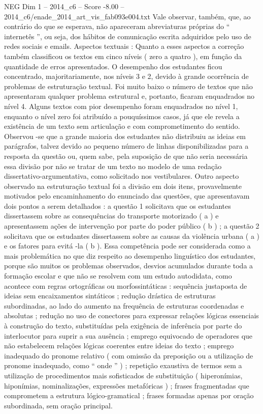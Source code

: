 \begin{textsample}{NEG Dim 1 – 2014\_c6 – Score -8.00 – 2014\_c6/enade\_2014\_art\_vis\_fab093e004.txt}
Vale observar, também, que, ao contrário do que se esperava, não apareceram abreviaturas próprias do “ internetês ”, ou seja, dos hábitos de comunicação escrita adquiridos pelo uso de redes sociais e emails.
Aspectos textuais : Quanto a esses aspectos a correção também classificou os textos em cinco níveis ( zero a quatro ), em função da quantidade de erros apresentados.
O desempenho dos estudantes ficou concentrado, majoritariamente, nos níveis 3 e 2, devido à grande ocorrência de problemas de estruturação textual.
Foi muito baixo o número de textos que não apresentaram qualquer problema estrutural e, portanto, ficaram enquadrados no nível 4.
Alguns textos com pior desempenho foram enquadrados no nível 1, enquanto o nível zero foi atribuído a pouquíssimos casos, já que ele revela a existência de um texto sem articulação e com comprometimento do sentido.
Observou -se que a grande maioria dos estudantes não distribuiu as ideias em parágrafos, talvez devido ao pequeno número de linhas disponibilizadas para a resposta da questão ou, quem sabe, pela suposição de que não seria necessária essa divisão por não se tratar de um texto no modelo de uma redação dissertativo-argumentativa, como solicitado nos vestibulares.
Outro aspecto observado na estruturação textual foi a divisão em dois itens, provavelmente motivados pelo encaminhamento do enunciado das questões, que apresentavam dois pontos a serem detalhados : a questão 1 solicitava que os estudantes dissertassem sobre as consequências do transporte motorizado ( a ) e apresentassem ações de intervenção por parte do poder público ( b ) ; a questão 2 solicitava que os estudantes dissertassem sobre as causas da violência urbana ( a ) e os fatores para evitá -la ( b ).
Essa competência pode ser considerada como a mais problemática no que diz respeito ao desempenho linguístico dos estudantes, porque são muitos os problemas observados, desvios acumulados durante toda a formação escolar e que não se resolvem com um estudo autodidata, como acontece com regras ortográficas ou morfossintáticas : sequência justaposta de ideias sem encaixamentos sintáticos ; redução drástica de estruturas subordinadas, ao lado do aumento na frequência de estruturas coordenadas e absolutas ; redução no uso de conectores para expressar relações lógicas essenciais à construção do texto, substituídas pela exigência de inferência por parte do interlocutor para suprir a sua ausência ; emprego equivocado de operadores que não estabelecem relações lógicas coerentes entre ideias do texto ; emprego inadequado do pronome relativo ( com omissão da preposição ou a utilização de pronome inadequado, como “ onde ” ) ; repetição exaustiva de termos sem a utilização de procedimentos mais sofisticados de substituição ( hiperonímias, hiponímias, nominalizações, expressões metafóricas ) ; frases fragmentadas que comprometem a estrutura lógico-gramatical ; frases formadas apenas por oração subordinada, sem oração principal.

\end{textsample}
